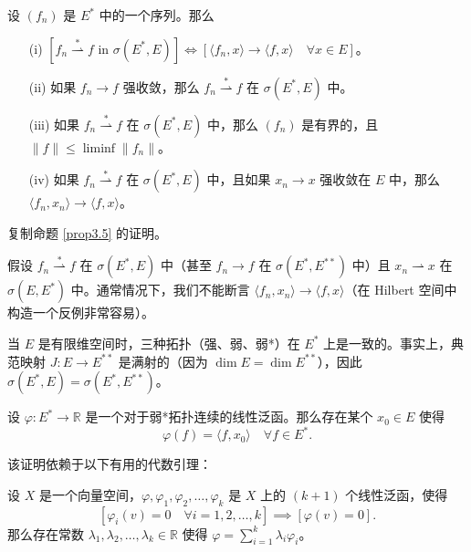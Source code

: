 \begin{proposition}\label{prop3.13}
设 $(f_n)$ 是 $E^*$ 中的一个序列。那么
\begin{itemize}
    \item[(i)] $[f_n \stackrel{*}{\rightharpoonup} f \text{ in } \sigma(E^*, E)] \iff [\langle f_n, x \rangle \to \langle f, x \rangle \quad \forall x \in E]$。
    \item[(ii)] 如果 $f_n \to f$ 强收敛，那么 $f_n \stackrel{*}{\rightharpoonup} f$ 在 $\sigma(E^*, E)$ 中。
    \item[(iii)] 如果 $f_n \stackrel{*}{\rightharpoonup} f$ 在 $\sigma(E^*, E)$ 中，那么 $(f_n)$ 是有界的，且 $\|f\| \le \liminf \|f_n\|$。
    \item[(iv)] 如果 $f_n \stackrel{*}{\rightharpoonup} f$ 在 $\sigma(E^*, E)$ 中，且如果 $x_n \to x$ 强收敛在 $E$ 中，那么 $\langle f_n, x_n \rangle \to \langle f, x \rangle$。
\end{itemize}
复制命题 \ref{prop3.5} 的证明。
\end{proposition}

\begin{remark}\label{remark3.9}
假设 $f_n \stackrel{*}{\rightharpoonup} f$ 在 $\sigma(E^*, E)$ 中（甚至 $f_n \to f$ 在 $\sigma(E^*, E^{**})$ 中）且 $x_n \rightharpoonup x$ 在 $\sigma(E, E^*)$ 中。通常情况下，我们不能断言 $\langle f_n, x_n \rangle \to \langle f, x \rangle$（在 Hilbert 空间中构造一个反例非常容易）。
\end{remark}

\begin{remark}\label{remark3.10}
当 $E$ 是有限维空间时，三种拓扑（强、弱、弱*）在 $E^*$ 上是一致的。事实上，典范映射 $J: E \to E^{**}$ 是满射的（因为 $\dim E = \dim E^{**}$），因此 $\sigma(E^*, E) = \sigma(E^*, E^{**})$。
\end{remark}

\begin{proposition}\label{prop3.14}
设 $\varphi: E^* \to \mathbb{R}$ 是一个对于弱*拓扑连续的线性泛函。那么存在某个 $x_0 \in E$ 使得
\[ \varphi(f) = \langle f, x_0 \rangle \quad \forall f \in E^*. \]
\end{proposition}

该证明依赖于以下有用的代数引理：
\begin{lemma}\label{lemma3.2}
设 $X$ 是一个向量空间，$\varphi, \varphi_1, \varphi_2, \dots, \varphi_k$ 是 $X$ 上的 $(k+1)$ 个线性泛函，使得
\begin{equation}\label{eq:lemma3.2_cond}
[\varphi_i(v) = 0 \quad \forall i = 1, 2, \dots, k] \implies [\varphi(v) = 0].
\end{equation}
那么存在常数 $\lambda_1, \lambda_2, \dots, \lambda_k \in \mathbb{R}$ 使得 $\varphi = \sum_{i=1}^k \lambda_i \varphi_i$。
\end{lemma}

